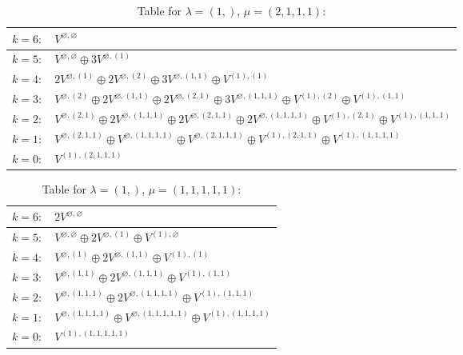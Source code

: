 \documentclass[a4paper,12pt]{article}
\begin{document}
\renewcommand{\arraystretch}{1.6} 
\begin{table}[H]
\centering
\caption{Table for $\lambda = (1,)$, $\mu = (2, 1, 1, 1)$:}
\begin{tabular}{|>{\centering\arraybackslash}p{15cm}|}
\hline
 $k = 6: \quad V^{\varnothing, \varnothing} $ \\ \hline
 $k = 5: \quad V^{\varnothing, \varnothing} \oplus 3 V^{\varnothing, (1)} $ \\ \hline
 $k = 4: \quad 2 V^{\varnothing, (1)} \oplus 2 V^{\varnothing, (2)} \oplus 3 V^{\varnothing, (1, 1)} \oplus V^{(1), (1)} $ \\ \hline
 $k = 3: \quad V^{\varnothing, (2)} \oplus 2 V^{\varnothing, (1, 1)} \oplus 2 V^{\varnothing, (2, 1)} \oplus 3 V^{\varnothing, (1, 1, 1)} \oplus V^{(1), (2)} \oplus V^{(1), (1, 1)} $ \\ \hline
 $k = 2: \quad V^{\varnothing, (2, 1)} \oplus 2 V^{\varnothing, (1, 1, 1)} \oplus 2 V^{\varnothing, (2, 1, 1)} \oplus 2 V^{\varnothing, (1, 1, 1, 1)} \oplus V^{(1), (2, 1)} \oplus V^{(1), (1, 1, 1)} $ \\ \hline
 $k = 1: \quad V^{\varnothing, (2, 1, 1)} \oplus V^{\varnothing, (1, 1, 1, 1)} \oplus V^{\varnothing, (2, 1, 1, 1)} \oplus V^{(1), (2, 1, 1)} \oplus V^{(1), (1, 1, 1, 1)} $ \\ \hline
 $k = 0: \quad V^{(1), (2, 1, 1, 1)} $ \\ \hline
\end{tabular}
\end{table}

\renewcommand{\arraystretch}{1.6} 
\begin{table}[H]
\centering
\caption{Table for $\lambda = (1,)$, $\mu = (1, 1, 1, 1, 1)$:}
\begin{tabular}{|>{\centering\arraybackslash}p{15cm}|}
\hline
 $k = 6: \quad 2 V^{\varnothing, \varnothing} $ \\ \hline
 $k = 5: \quad V^{\varnothing, \varnothing} \oplus 2 V^{\varnothing, (1)} \oplus V^{(1), \varnothing} $ \\ \hline
 $k = 4: \quad V^{\varnothing, (1)} \oplus 2 V^{\varnothing, (1, 1)} \oplus V^{(1), (1)} $ \\ \hline
 $k = 3: \quad V^{\varnothing, (1, 1)} \oplus 2 V^{\varnothing, (1, 1, 1)} \oplus V^{(1), (1, 1)} $ \\ \hline
 $k = 2: \quad V^{\varnothing, (1, 1, 1)} \oplus 2 V^{\varnothing, (1, 1, 1, 1)} \oplus V^{(1), (1, 1, 1)} $ \\ \hline
 $k = 1: \quad V^{\varnothing, (1, 1, 1, 1)} \oplus V^{\varnothing, (1, 1, 1, 1, 1)} \oplus V^{(1), (1, 1, 1, 1)} $ \\ \hline
 $k = 0: \quad V^{(1), (1, 1, 1, 1, 1)} $ \\ \hline
\end{tabular}
\end{table}
\end{document}
